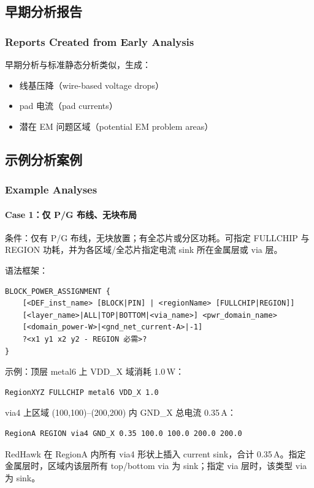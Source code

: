 \subsection{早期分析报告}
\subsubsection*{Reports Created from Early Analysis}

早期分析与标准静态分析类似，生成：
\begin{itemize}
  \item 线基压降（wire-based voltage drops）
  \item pad 电流（pad currents）
  \item 潜在 EM 问题区域（potential EM problem areas）
\end{itemize}

\subsection{示例分析案例}
\subsubsection*{Example Analyses}


\paragraph{Case 1：仅 P/G 布线、无块布局}
条件：仅有 P/G 布线，无块放置；有全芯片或分区功耗。可指定 FULLCHIP 与 REGION 功耗，并为各区域/全芯片指定电流 sink 所在金属层或 via 层。

语法框架：
\begin{lstlisting}
BLOCK_POWER_ASSIGNMENT {
    [<DEF_inst_name> [BLOCK|PIN] | <regionName> [FULLCHIP|REGION]]
    [<layer_name>|ALL|TOP|BOTTOM|<via_name>] <pwr_domain_name>
    [<domain_power-W>|<gnd_net_current-A>|-1]
    ?<x1 y1 x2 y2 - REGION 必需>?
}
\end{lstlisting}
示例：顶层 metal6 上 VDD\_X 域消耗 1.0\,W：
\begin{lstlisting}
RegionXYZ FULLCHIP metal6 VDD_X 1.0
\end{lstlisting}
via4 上区域 (100,100)--(200,200) 内 GND\_X 总电流 0.35\,A：
\begin{lstlisting}
RegionA REGION via4 GND_X 0.35 100.0 100.0 200.0 200.0
\end{lstlisting}
RedHawk 在 RegionA 内所有 via4 形状上插入 current sink，合计 0.35\,A。指定金属层时，区域内该层所有 top/bottom via 为 sink；指定 via 层时，该类型 via 为 sink。

